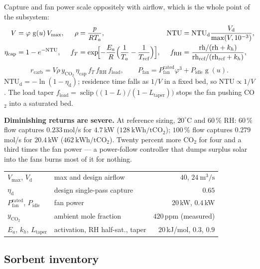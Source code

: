 \documentclass[11pt,a4paper]{article}
\newcommand{\sclip}{\operatorname{sclip}}
\newcommand{\gate}{\operatorname{g}}
\begin{document}
Capture and fan power scale oppositely with airflow, which is the whole point of
the subsystem:
\begin{align}
V &= \varphi\,\gate(u)\,V_{\max}, &
\rho &= \frac{p}{R T_a}, &
\mathrm{NTU} &= \mathrm{NTU}_{\text{d}}\frac{V_{\text{d}}}{\max(V,10^{-3})},\\
\eta_{\text{cap}} &= 1-e^{-\mathrm{NTU}}, &
f_T &= \exp\!\Bigl[-\frac{E_a}{R}\Bigl(\frac1{T_a}-\frac1{T_{\text{ref}}}\Bigr)\Bigr], &
f_{\mathrm{RH}} &= \frac{\mathrm{rh}/(\mathrm{rh}+k_h)}{\mathrm{rh}_{\text{ref}}/(\mathrm{rh}_{\text{ref}}+k_h)},
\end{align}
\begin{equation}
r_{\text{carb}} = V\rho\,y_{\mathrm{CO_2}}\,\eta_{\text{cap}}\,f_T\,f_{\mathrm{RH}}\,f_{\text{load}},
\qquad
P_{\text{fan}} = P_{\text{fan}}^{\text{rated}}\varphi^{3} + P_{\text{idle}}\gate(u).
\end{equation}
$\mathrm{NTU}_{\text{d}} = -\ln(1-\eta_{\text{d}})$; residence time falls as
$1/V$ in a fixed bed, so $\mathrm{NTU}\propto 1/V$. The load taper
$f_{\text{load}} = \sclip\bigl((1-L)/(1-L_{\text{taper}})\bigr)$ stops the fan
pushing CO$_2$ into a saturated bed.

\textbf{Diminishing returns are severe.} At reference sizing, $20^\circ$C and
60\,\% RH: $60\,\%$ flow captures $0.233$\,mol/s for $4.7$\,kW
($128\ \mathrm{kWh/tCO_2}$); $100\,\%$ flow captures $0.279$\,mol/s for
$20.4$\,kW ($462\ \mathrm{kWh/tCO_2}$). Twenty percent more CO$_2$ for four and
a third times the fan power --- a power-follow controller that dumps surplus
solar into the fans burns most of it for nothing.

\begin{center}\small
\begin{tabular}{llr}
\toprule
$V_{\max}$, $V_{\text{d}}$ & max and design airflow & $40$, $24\ \mathrm{m^3/s}$\\
$\eta_{\text{d}}$ & design single-pass capture & $0.65$\\
$P_{\text{fan}}^{\text{rated}}$, $P_{\text{idle}}$ & fan power & $20$\,kW, $0.4$\,kW\\
$y_{\mathrm{CO_2}}$ & ambient mole fraction & $420$\,ppm (measured)\\
$E_a$, $k_h$, $L_{\text{taper}}$ & activation, RH half-sat., taper & $20$\,kJ/mol, $0.3$, $0.9$\\
\bottomrule
\end{tabular}
\end{center}

\subsection{Sorbent inventory}
\label{sub:solids}
\end{document}

